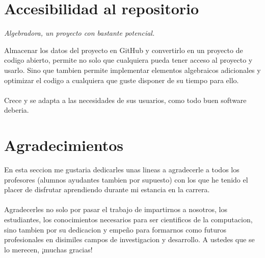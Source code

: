 \documentclass{article}
\begin{document}
\newpage

\section{Accesibilidad al repositorio}
\begin{center}
    \textit{Algebradora, un proyecto con bastante potencial.}
\end{center}
Almacenar los datos del proyecto en GitHub y convertirlo en un proyecto de codigo abierto, permite no solo que cualquiera pueda tener acceso al proyecto y usarlo. Sino que tambien permite implementar elementos algebraicos adicionales y optimizar el codigo a cualquiera que guste disponer de su tiempo para ello.\\\\
Crece y se adapta a las necesidades de sus usuarios, como todo buen software deberia.

\newpage

\section{Agradecimientos}
En esta seccion me gustaria dedicarles unas lineas a agradecerle a todos los profesores (alumnos ayudantes tambien por supuesto) con los que he tenido el placer de disfrutar aprendiendo durante mi estancia en la carrera.\\\\
Agradecerles no solo por pasar el trabajo de impartirnos a nosotros, los estudiantes, los conocimientos necesarios para ser cientificos de la computacion, sino tambien por su dedicacion y empeño para formarnos como futuros profesionales en disimiles campos de investigacion y desarrollo. A ustedes que se lo merecen, ¡muchas gracias!
\end{document}
